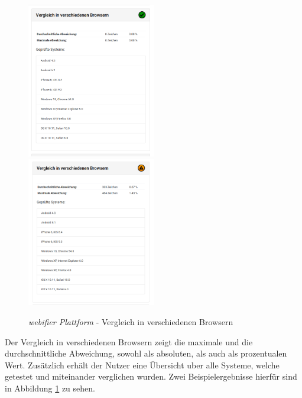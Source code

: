 \begin{figure}[H]
\centerline{%
\includegraphics[width=0.5\textwidth]{images/platform/header-inspection-clean}%
\includegraphics[width=0.5\textwidth]{images/platform/header-inspection-suspicious}%
}%
\caption{\textit{webifier Plattform} - Vergleich in verschiedenen Browsern}
\label{fig:platform-result-header-inspection}
\end{figure}

Der Vergleich in verschiedenen Browsern zeigt die maximale und die durchschnittliche Abweichung, sowohl als absoluten, als auch als prozentualen Wert. Zusätzlich erhält der Nutzer eine Übersicht uber alle Systeme, welche getestet und miteinander verglichen wurden. Zwei Beispielergebnisse hierfür sind in Abbildung \ref{fig:platform-result-header-inspection} zu sehen.

